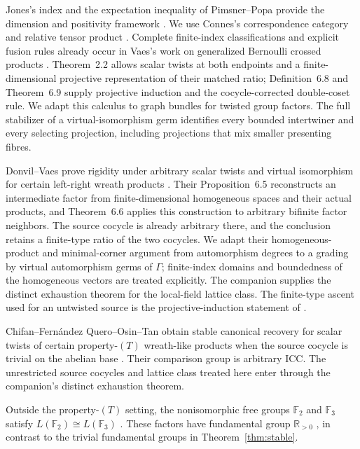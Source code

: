 Jones's index and the expectation inequality of Pimsner--Popa provide the
dimension and positivity framework \cite{Jones1983,PimsnerPopa1986}.
We use Connes's correspondence category and relative tensor product
\cite[Chapter V, Appendix B]{Connes1994}. Complete finite-index classifications and explicit fusion rules already
occur in Vaes's work on generalized Bernoulli crossed products
\cite[Theorem~2.2 and Section~6.2]{Vaes2008}.  Theorem~2.2 allows scalar
twists at both endpoints and a finite-dimensional projective representation
of their matched ratio; Definition~6.8 and Theorem~6.9 supply projective
induction and the cocycle-corrected double-coset rule.  We adapt this
calculus to graph bundles for twisted group factors.  The full stabilizer
of a virtual-isomorphism germ identifies every bounded intertwiner and
every selecting projection, including projections that mix smaller
presenting fibres.

Donvil--Vaes prove rigidity under arbitrary scalar twists and virtual
isomorphism for certain left-right wreath products
\cite{DonvilVaes2025}.  Their Proposition~6.5 reconstructs an intermediate
factor from finite-dimensional homogeneous spaces and their actual
products, and Theorem~6.6 applies this construction to arbitrary bifinite
factor neighbors.  The source cocycle is already arbitrary there, and
the conclusion retains a finite-type ratio of the two cocycles.  We adapt
their homogeneous-product and minimal-corner argument from automorphism
degrees to a grading by virtual automorphism germs of $\Gamma$; finite-index domains
and boundedness of the homogeneous vectors are treated explicitly.
The companion supplies the distinct exhaustion theorem for the
local-field lattice class.  The finite-type ascent used for an untwisted
source is the projective-induction statement of
\cite[Lemmas~6.7--6.8]{DonvilVaes2025}.

Chifan--Fern\'andez Quero--Osin--Tan obtain stable canonical recovery
for scalar twists of certain property-$(T)$ wreath-like products when
the source cocycle is trivial on the abelian base
\cite[Theorem~F]{CFOT2026}. Their comparison group is arbitrary ICC.
The unrestricted source cocycles and lattice class treated here enter
through the companion's distinct exhaustion theorem.

Outside the property-$(T)$ setting, the nonisomorphic free groups
$\mathbb F_2$ and $\mathbb F_3$ satisfy
$L(\mathbb F_2)\cong L(\mathbb F_3)$
\cite[Theorem~1.2]{OpenAIFreeGroupFactors2026}.
These factors have fundamental group $\mathbb R_{>0}$
\cite[Corollary~6.1]{OpenAIFreeGroupFactors2026}, in contrast to the
trivial fundamental groups in Theorem~\ref{thm:stable}.

